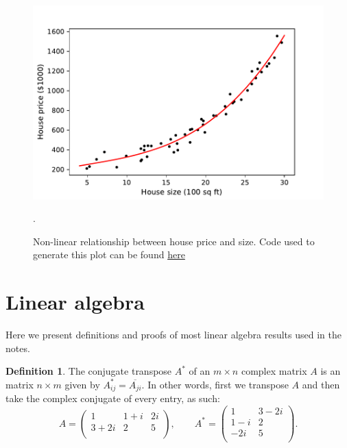\documentclass{article}
\theoremstyle{definition}
\newtheorem{definition}{Definition}[section]
\begin{document}
\begin{figure}[ht]
\centering
\includegraphics[scale=0.7]{images/lin_reg/poly-data.pdf}
\caption{Non-linear relationship between house price and size. Code used to generate this plot can be found \href{https://github.com/siavashaslanbeigi/ml_notes_supp/blob/master/lin_reg/poly.ipynb}{\color{blue} here}}.
\label{linreg-fig:poly-data}
\end{figure}


\appendix
\section{Linear algebra}
Here we present definitions and proofs of most linear algebra results used in the notes.
\begin{definition}
The conjugate transpose $A^*$ of an $m\times n$ complex matrix $A$ is an matrix $n \times m$ given by $A^*_{ij}=\overline{A_{ji}}$. In other words, first we transpose $A$ and then take the complex conjugate of every entry, as such:
\begin{equation}
    A =
    \begin{pmatrix}
        1 & 1+i & 2i \\
        3+2i & 2 & 5 \\
    \end{pmatrix},
    \qquad
    A^* =
    \begin{pmatrix}
        1 & 3-2i \\
        1-i & 2 \\
        -2i & 5 \\
    \end{pmatrix}.
\end{equation}
\end{definition}
\end{document}
